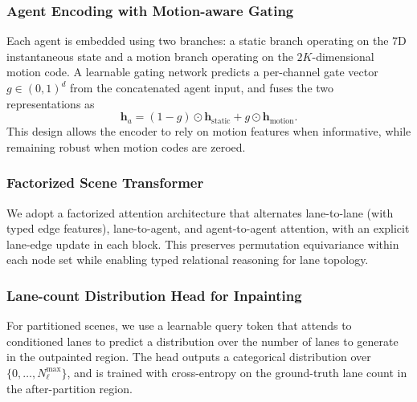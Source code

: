 \documentclass{article}
\theoremstyle{plain}
\theoremstyle{definition}
\theoremstyle{remark}
\begin{document}
\subsubsection{Agent Encoding with Motion-aware Gating}

Each agent is embedded using two branches: a static branch operating on the 7D instantaneous state and a motion branch operating
on the \(2K\)-dimensional motion code. A learnable gating network predicts a per-channel gate vector \(g\in(0,1)^{d}\) from the
concatenated agent input, and fuses the two representations as
\[
\mathbf{h}_{a} = (1-g)\odot \mathbf{h}_{\text{static}} + g\odot \mathbf{h}_{\text{motion}}.
\]
This design allows the encoder to rely on motion features when informative, while remaining robust when motion codes are zeroed.

\subsubsection{Factorized Scene Transformer}

We adopt a factorized attention architecture that alternates lane-to-lane (with typed edge features), lane-to-agent, and agent-to-agent
attention, with an explicit lane-edge update in each block. This preserves permutation equivariance within each node set while enabling
typed relational reasoning for lane topology.

\subsubsection{Lane-count Distribution Head for Inpainting}

For partitioned scenes, we use a learnable query token that attends to conditioned lanes to predict a distribution over the number
of lanes to generate in the outpainted region. The head outputs a categorical distribution over \(\{0,\dots,N_{\ell}^{\max}\}\), and is trained
with cross-entropy on the ground-truth lane count in the after-partition region.
\end{document}
